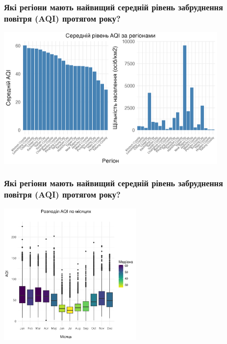 \documentclass{beamer}
\begin{document}
\begin{frame}
  \frametitle{Які регіони мають найвищий середній рівень забруднення повітря (AQI) протягом року?}

  \begin{center}
    \includegraphics[height=2.8in]{plots/question4/avg_aqi_by_county_w_dens.png}
  \end{center}
\end{frame}

\begin{frame}
  \frametitle{Які регіони мають найвищий середній рівень забруднення повітря (AQI) протягом року?}

  \begin{center}
    \includegraphics[height=2.8in]{plots/question4/seasonal_change.png}
  \end{center}
\end{frame}
\end{document}
